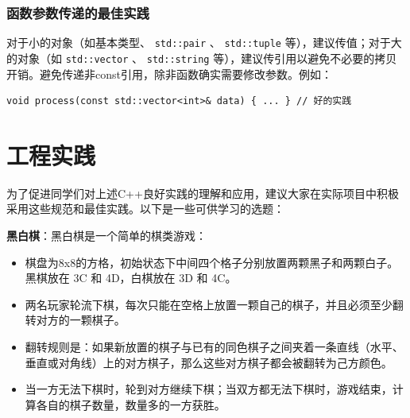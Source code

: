 \subsubsection{函数参数传递的最佳实践}

对于小的对象（如基本类型、 \texttt{std::pair} 、 \texttt{std::tuple} 等），建议传值；对于大的对象（如 \texttt{std::vector} 、 \texttt{std::string} 等），建议传引用以避免不必要的拷贝开销。避免传递非const引用，除非函数确实需要修改参数。例如：
\begin{verbatim}
void process(const std::vector<int>& data) { ... } // 好的实践
\end{verbatim}

\section{工程实践}

为了促进同学们对上述C++良好实践的理解和应用，建议大家在实际项目中积极采用这些规范和最佳实践。以下是一些可供学习的选题：

\textbf{黑白棋}：黑白棋是一个简单的棋类游戏：

\begin{itemize}
    \item 棋盘为8x8的方格，初始状态下中间四个格子分别放置两颗黑子和两颗白子。黑棋放在 3C 和 4D，白棋放在 3D 和 4C。
    \item 两名玩家轮流下棋，每次只能在空格上放置一颗自己的棋子，并且必须至少翻转对方的一颗棋子。
    \item 翻转规则是：如果新放置的棋子与已有的同色棋子之间夹着一条直线（水平、垂直或对角线）上的对方棋子，那么这些对方棋子都会被翻转为己方颜色。
    \item 当一方无法下棋时，轮到对方继续下棋；当双方都无法下棋时，游戏结束，计算各自的棋子数量，数量多的一方获胜。
\end{itemize}


